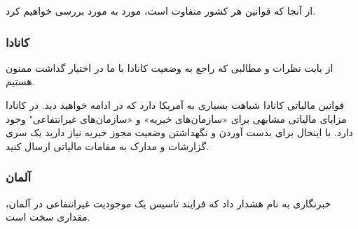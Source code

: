 از آنجا که قوانین هر کشور متفاوت است، مورد به مورد بررسی خواهیم کرد.
\subsubsection{کانادا}
از
بابت نظرات و مطالبی که راجع به وضعیت کانادا با ما در اختیار گذاشت ممنون هستیم.


قوانین مالیاتی کانادا شباهت بسیاری به آمریکا دارد که در ادامه خواهید دید.
در کانادا مزایای مالیاتی مشابهی برای «سازمان‌های خیریه» و «سازمان‌های غیرانتفاعی"
وجود دارد. با اینحال برای بدست آوردن و نگهداشتن وضعیت مجوز خیریه نیاز دارید
یک سری گزارشات و مدارک به مقامات مالیاتی ارسال کنید.

\subsubsection{آلمان}

خبرنگاری به نام
هشدار داد که فرایند تاسیس یک موجودیت غیرانتفاعی در آلمان، مقداری سخت است.

